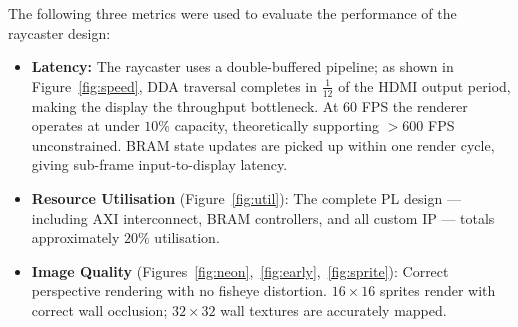 

The following three metrics were used to evaluate the performance of the raycaster design:

\begin{itemize}
    \item \textbf{Latency:} The raycaster uses a double-buffered pipeline; 
    as shown in Figure~\ref{fig:speed}, DDA traversal completes in 
    $\frac{1}{12}$ of the HDMI output period, making the display the 
    throughput bottleneck. At 60 FPS the renderer operates at under $10\%$ 
    capacity, theoretically supporting $>$600 FPS unconstrained. BRAM state 
    updates are picked up within one render cycle, giving sub-frame 
    input-to-display latency.

    \item \textbf{Resource Utilisation} (Figure~\ref{fig:util}): The 
    complete PL design --- including AXI interconnect, BRAM controllers, 
    and all custom IP --- totals approximately $20\%$ utilisation.

    \item \textbf{Image Quality} (Figures~\ref{fig:neon},~\ref{fig:early},~\ref{fig:sprite}): 
    Correct perspective rendering with no fisheye distortion. $16\times16$ 
    sprites render with correct wall occlusion; $32\times32$ wall textures 
    are accurately mapped.
\end{itemize}

